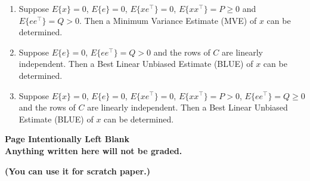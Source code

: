 \documentclass[letterpaper]{article}
\begin{document}
\begin{enumerate}
\begin{enumerate}
\item Suppose $E\{x\}=0$, $E\{e\}=0$, $E\{xe^\top\}=0$,  $E\{x x^\top\}=P \ge 0$  and $E\{e e^\top\}=Q > 0$. Then a  Minimum Variance Estimate (MVE) of $x$ can be determined.


\item  Suppose  $E\{e\}=0$, $E\{e e^\top\}=Q >0$ and the rows of $C$ are linearly independent. Then a Best Linear Unbiased Estimate (BLUE) of $x$ can be determined.


\item  Suppose $E\{x\}=0$, $E\{e\}=0$, $E\{xe^\top\}=0$,  $E\{x x^\top\}=P > 0$, $E\{e e^\top\}=Q \ge 0$ and the rows of $C$ are linearly independent. Then a Best Linear Unbiased Estimate (BLUE) of $x$ can be determined.



\end{enumerate}


\newpage

\begin{center}
\vspace*{6cm}

{\bf \LARGE Page Intentionally Left Blank}\\

\vspace*{3cm}
\textbf{Anything written here will not be graded.}

\textbf{(You can use it for scratch paper.)}

\end{center}
\newpage


\end{enumerate}
\end{document}
